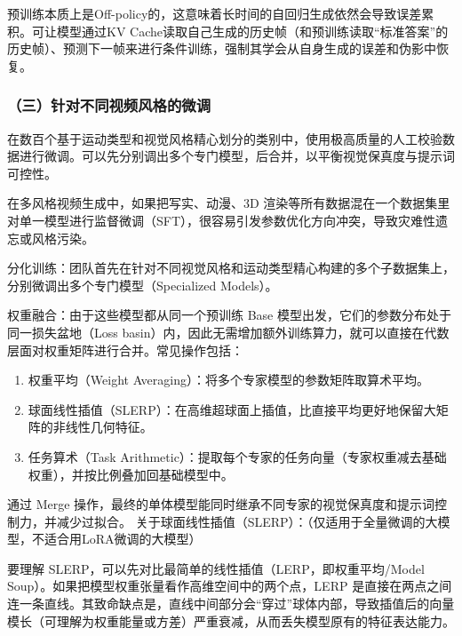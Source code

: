 预训练本质上是Off-policy的，这意味着长时间的自回归生成依然会导致误差累积。可让模型通过KV Cache读取自己生成的历史帧（和预训练读取``标准答案''的历史帧）、预测下一帧来进行条件训练，强制其学会从自身生成的误差和伪影中恢复。

\hypertarget{ux4e09ux9488ux5bf9ux4e0dux540cux89c6ux9891ux98ceux683cux7684ux5faeux8c03}{%
\subsubsection{（三）针对不同视频风格的微调}\label{ux4e09ux9488ux5bf9ux4e0dux540cux89c6ux9891ux98ceux683cux7684ux5faeux8c03}}

在数百个基于运动类型和视觉风格精心划分的类别中，使用极高质量的人工校验数据进行微调。可以先分别调出多个专门模型，后合并，以平衡视觉保真度与提示词可控性。

在多风格视频生成中，如果把写实、动漫、3D 渲染等所有数据混在一个数据集里对单一模型进行监督微调（SFT），很容易引发参数优化方向冲突，导致灾难性遗忘或风格污染。

分化训练：团队首先在针对不同视觉风格和运动类型精心构建的多个子数据集上，分别微调出多个专门模型（Specialized Models）。

权重融合：由于这些模型都从同一个预训练 Base 模型出发，它们的参数分布处于同一损失盆地（Loss basin）内，因此无需增加额外训练算力，就可以直接在代数层面对权重矩阵进行合并。常见操作包括：

\begin{enumerate}
\def\labelenumi{\arabic{enumi}.}
\item
  权重平均（Weight Averaging）：将多个专家模型的参数矩阵取算术平均。
\item
  球面线性插值（SLERP）：在高维超球面上插值，比直接平均更好地保留大矩阵的非线性几何特征。
\item
  任务算术（Task Arithmetic）：提取每个专家的任务向量（专家权重减去基础权重），并按比例叠加回基础模型中。
\end{enumerate}

通过 Merge 操作，最终的单体模型能同时继承不同专家的视觉保真度和提示词控制力，并减少过拟合。
关于球面线性插值（SLERP）：（仅适用于全量微调的大模型，不适合用LoRA微调的大模型）

要理解 SLERP，可以先对比最简单的线性插值（LERP，即权重平均/Model Soup）。如果把模型权重张量看作高维空间中的两个点，LERP 是直接在两点之间连一条直线。其致命缺点是，直线中间部分会``穿过''球体内部，导致插值后的向量模长（可理解为权重能量或方差）严重衰减，从而丢失模型原有的特征表达能力。

